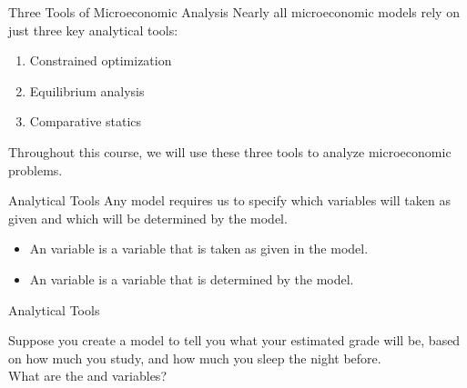 \documentclass{beamer}
\begin{document}
\begin{frame}{Three Tools of Microeconomic Analysis}
  Nearly all microeconomic models rely on just three key analytical tools:
  \begin{enumerate}
    \item Constrained optimization
    \item Equilibrium analysis
    \item Comparative statics
  \end{enumerate}

  \bigskip
  Throughout this course, we will use these three tools to analyze microeconomic problems.
\end{frame}

\begin{frame}{Analytical Tools}
  Any model requires us to specify which variables will taken as given and which will be determined by the model.
  \begin{itemize}
    \item An  variable is a variable that is taken as given in the model.
    \item An  variable is a variable that is determined by the model.
  \end{itemize}
\end{frame}

\begin{frame}{Analytical Tools}
  \bigskip
  
  Suppose you create a model to tell you what your estimated grade will be, based on how much you study, and how much you sleep the night before. 
\\
  What are the  and  variables?

\end{frame}
\end{document}
